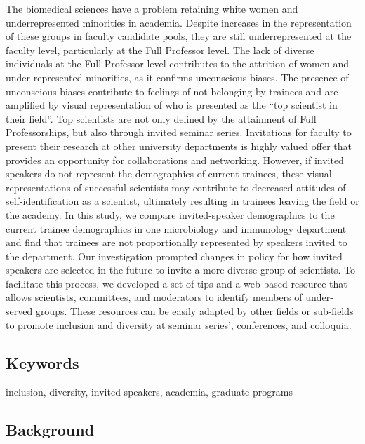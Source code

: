 \documentclass[10pt,]{article}
\begin{document}
The biomedical sciences have a problem retaining white women and
underrepresented minorities in academia. Despite increases in the
representation of these groups in faculty candidate pools, they are
still underrepresented at the faculty level, particularly at the Full
Professor level. The lack of diverse individuals at the Full Professor
level contributes to the attrition of women and under-represented
minorities, as it confirms unconscious biases. The presence of
unconscious biases contribute to feelings of not belonging by trainees
and are amplified by visual representation of who is presented as the
``top scientist in their field''. Top scientists are not only defined by
the attainment of Full Professorships, but also through invited seminar
series. Invitations for faculty to present their research at other
university departments is highly valued offer that provides an
opportunity for collaborations and networking. However, if invited
speakers do not represent the demographics of current trainees, these
visual representations of successful scientists may contribute to
decreased attitudes of self-identification as a scientist, ultimately
resulting in trainees leaving the field or the academy. In this study,
we compare invited-speaker demographics to the current trainee
demographics in one microbiology and immunology department and find that
trainees are not proportionally represented by speakers invited to the
department. Our investigation prompted changes in policy for how invited
speakers are selected in the future to invite a more diverse group of
scientists. To facilitate this process, we developed a set of tips and a
web-based resource that allows scientists, committees, and moderators to
identify members of under-served groups. These resources can be easily
adapted by other fields or sub-fields to promote inclusion and diversity
at seminar series', conferences, and colloquia.

\subsection{Keywords}\label{keywords}

inclusion, diversity, invited speakers, academia, graduate programs

\newpage

\subsection{Background}\label{background}
\end{document}
